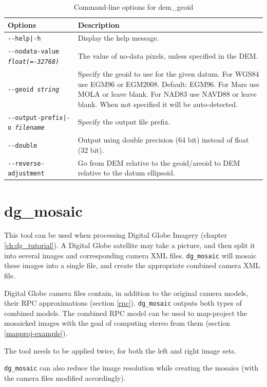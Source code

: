 \begin{longtable}{|l|p{10cm}|}
\caption{Command-line options for dem\_geoid}
\label{tbl:demgeoid}
\endfirsthead
\endhead
\endfoot
\endlastfoot
\hline
Options & Description \\ \hline \hline
\texttt{-\/-help|-h} & Display the help message.\\ \hline
\texttt{-\/-nodata-value \textit{float(=-32768)}} & The value of no-data pixels, unless specified in the DEM. \\ \hline
\texttt{-\/-geoid \textit{string}} &Specify the geoid to use for the given datum. For WGS84 use EGM96 or EGM2008. Default: EGM96. For Mars use MOLA or leave blank. For NAD83 use NAVD88 or leave blank. When not specified it will be auto-detected. \\ \hline
\texttt{-\/-output-prefix|-o \textit{filename}} & Specify the output file prefix. \\ \hline
\texttt{-\/-double} & Output using double precision (64 bit) instead of float (32 bit).\\ \hline
\texttt{-\/-reverse-adjustment} & Go from DEM relative to the geoid/areoid to DEM relative to the datum ellipsoid.\\ \hline
\end{longtable}

\section{dg\_mosaic}
\label{dgmosaic}

This tool can be used when processing Digital Globe Imagery (chapter
\ref{ch:dg_tutorial}). A Digital Globe satellite may take a
picture, and then split it into several images and corresponding camera
XML files. \texttt{dg\_mosaic} will mosaic these images into a single
file, and create the appropriate combined camera XML file.

Digital Globe camera files contain, in addition to the original camera
models, their RPC approximations (section
\ref{rpc}). \texttt{dg\_mosaic} outputs both types of combined
models. The combined RPC model can be used to map-project the mosaicked
images with the goal of computing stereo from them (section
\ref{mapproj-example}).

The tool needs to be applied twice, for both the left and right image sets.

\texttt{dg\_mosaic} can also reduce the image resolution while creating the
mosaics (with the camera files modified accordingly).


